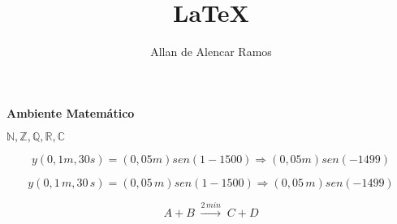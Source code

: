 \documentclass[12pt, a4paper]{article}
\begin{document}
\title{LaTeX}
\author{Allan de Alencar Ramos}
\maketitle

\begin{center}
\large\textbf{Ambiente Matemático}
\end{center}
\vspace{0.5cm}

$ \mathbb{N, Z, Q, R, C} $


\begin{equation}
y(0, 1m, 30s) = (0,05m) sen(1-1500) \Rightarrow (0,05m) sen(-1499) 
\end{equation}

\begin{equation}
y(0, 1 \,m, 30 \,s) = (0,05 \,m) sen(1 - 1500) \Rightarrow (0,05 \,m) sen(-1499) 
\end{equation}

\begin{equation}
A + B \; \stackrel{2\,min}{\longrightarrow}\; C + D
\end{equation}
\end{document}
